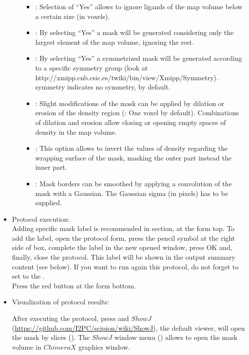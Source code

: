 \begin{itemize}
\begin{itemize}
\begin{itemize}
                \item {}: Selection of ``Yes'' allows to ignore ligands of the map volume below a certain size (in voxels).
                \item {}: By selecting ``Yes'' a mask will be generated considering only the largest element of the map volume, ignoring the rest.
                \item {}: By selecting ``Yes'' a symmetrized mask will be generated according to a specific symmetry group (look at http://xmipp.cnb.csic.es/twiki/bin/view/Xmipp/Symmetry).  symmetry indicates no symmetry, by default.
                \item {}: Slight modifications of the mask can be applied by dilation or erosion of the density region (: One voxel by default). Combinations of dilation and erosion allow closing or opening empty spaces of density in the map volume.
                \item {}: This option allows to invert the values of density regarding the wrapping surface of the mask, masking the outer part instead the inner part.
                \item {}: Mask borders can be smoothed by applying a convolution of the mask with a Gaussian. The Gaussian sigma (in pixels) has to be supplied.
                \end{itemize}

    \end{itemize}
 
 \item Protocol execution:\\
 Adding specific mask label is recommended in  section, at the form top. To add the label, open the protocol form, press the pencil symbol at the right side of  box, complete the label in the new opened window, press OK and, finally, close the protocol. This label will be shown in the output summary content (see below). If you want to run again this protocol, do not forget to set to  the .\\
  Press the  red button at the form bottom.
  
  \item Visualization of protocol results:
  
  After executing the protocol, press  and $ShowJ$ (\url{https://github.com/I2PC/scipion/wiki/ShowJ}), the default \scipion viewer, will open the mask by slices (). The $ShowJ$ window menu () allows to open the mask volume in $ChimeraX$ graphics window.


\end{itemize}
